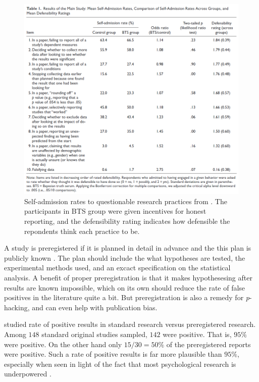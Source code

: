 \begin{figure}
\noindent \begin{centering}
\includegraphics[scale=0.5]{chunks/john2012}
\par\end{centering}
\caption{\label{fig:john2012}Self-admission rates to questionable research
practices from \cite{John2012-xp}. The participants in BTS group
were given incentives for honest reporting, and the defensibility
rating indicates how defensible the repondents think each practice
to be.}
\end{figure}

A study is preregistered if it is planned in detail in advance and
the this plan is publicly known \parencite{Van_t_Veer2016-fo}. The plan
should include the what hypotheses are tested, the experimental methods
used, and an excact specification on the statistical analysis. A benefit
of proper preregistration is that it makes hypothesesing after results
are known impossible, which on its own should reduce the rate of false
positives in the literature quite a bit. But preregistration is also
a remedy for \emph{p}-hacking, and can even help with publication
bias.

\cite{Scheel2020-sq} studied rate of positive results in standard
research versus preregistered research. Among $148$ standard original
studies sampled, $142$ were positive. That is, $95\%$ were positive.
On the other hand only $15/30=50\%$ of the preregistered reports
were positive. Such a rate of positive results is far more plausible
than $95\%$, especially when seen in light of the fact that most
psychological research is underpowered \parencite{Sedlmeier1989-zz}.

